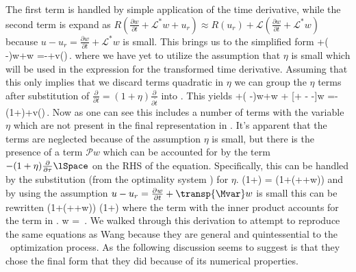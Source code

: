 The first term is handled by simple application of the time derivative,
while the second term is expand as $R(\frac{\partial w}{\partial t}+\mathcal{L}^{*}w +u_r)
\approx R(u_r) + \mathcal{L}(\frac{\partial w}{\partial t}+\mathcal{L}^{*}w)$ because
$u-u_r = \frac{\partial w}{\partial t}+\mathcal{L}^{*}w$ is small. This brings
us to the simplified form
\beq \label{e-linwgbgqstepone}
+(\transp{\Mvar}
-\Mvar{})w+\Mvar \transp{\Mvar}w =-\lSpace+v(\lSpace)\,.
\eeq
where we have yet to utilize the assumption that $\eta$ is small which will be used
in the expression for the transformed time derivative. Assuming that this only
implies that we discard terms quadratic in $\eta$ we can group the $\eta$ terms
after substitution of $\frac{\partial}{\partial t}=(1+\eta)\frac{\partial}{\partial \tilde{t}}$
into . This yields
\beq \label{e-linwgbgqsteptwo}
+(\frac{\partial}{\partial \tau}\transp{\Mvar}
-\Mvar\frac{\partial}{\partial \tau})w+\Mvar \transp{\Mvar}w
+ [\eta {}+\frac{\partial}{\partial \tau} \eta \frac{\partial}{\partial \tau}
-\eta \frac{\partial}{\partial \tau}\transp{\Mvar} -\Mvar \eta \frac{\partial}{\partial \tau}]w
=-(1+\eta)\frac{\partial}{\partial \tau}\lSpace+v(\lSpace)\,.
\eeq
Now as one can see this includes a number of terms with the variable $\eta$ which are not present in
the final representation in . It's apparent that the terms are neglected because
of the assumption $\eta$ is small, but there is the presence
of a term $\mathcal{P}w$ which can be accounted for by the term
$-(1+\eta)\frac{\partial}{\partial \tau}\lSpace$ on the RHS of the
equation. Specifically, this can be handled by the substitution
(from the optimality system ) for
$\eta$.
\beq
(1+)\frac{\partial \lSpace}{\partial \tau}
= (1+(\lSpace++\transp{\Mvar}w))\frac{\partial \lSpace}{\partial \tau}
\eeq
and by using the assumption $u-u_r=\frac{\partial w}{\partial t}+\transp{\Mvar}w$ is small
this can be rewritten
\beq
(1+(\lSpace++\transp{\Mvar}w))\frac{\partial \lSpace}{\partial \tau}
\approx (1+)\frac{\partial \lSpace}{\partial \tau}
\eeq
where the term with the inner product accounts for the term in .
\beq
{}w = \frac{\partial \lSpace}{\partial \tau}\,.
\eeq
We walked through this derivation to attempt to reproduce the same equations as Wang \etal{} because
they are general and quintessential to the \spt\ optimization process. As the following
discussion seems to suggest is that they chose the final form that they did because
of its numerical properties.


